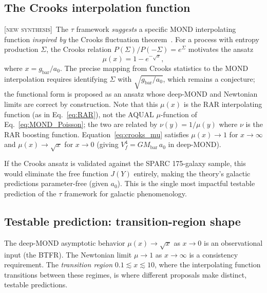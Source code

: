\documentclass[prd,twocolumn,superscriptaddress,longbibliography,floatfix]{revtex4-2}
\newcommand{\tauasym}{\tau}
\newcommand{\new}{\textsc{[new synthesis]}}
\begin{document}
\subsection{The Crooks interpolation function}
\label{sec:crooks}

\new\  The $\tauasym$ framework \emph{suggests} a specific MOND
interpolating function \emph{inspired by} the Crooks fluctuation
theorem~\cite{Crooks1999}.  For a process with entropy production
$\Sigma$, the Crooks relation $P(\Sigma)/P(-\Sigma) = e^\Sigma$
motivates the ansatz
\begin{equation}
\mu(x) = 1 - e^{-\sqrt{x}},
\label{eq:crooks_mu}
\end{equation}
where $x = g_{\mathrm{bar}}/a_0$.
The precise mapping from Crooks statistics to the MOND interpolation
requires identifying $\Sigma$ with $\sqrt{g_{\mathrm{bar}}/a_0}$,
which remains a conjecture; the functional form is proposed as an
ansatz whose deep-MOND and Newtonian limits are correct by
construction.
Note that this $\mu(x)$ is the RAR interpolating function
(as in Eq.~\eqref{eq:RAR}), not the AQUAL $\mu$-function of
Eq.~\eqref{eq:MOND_Poisson}; the two are related by
$\nu(y) = 1/\mu(y)$ where $\nu$ is the RAR boosting function.
Equation~\eqref{eq:crooks_mu} satisfies $\mu(x) \to 1$ for
$x \to \infty$ and $\mu(x) \to \sqrt{x}$ for $x \to 0$
(giving $V_f^4 = GM_{\mathrm{bar}}\,a_0$ in deep-MOND).

If the Crooks ansatz is validated against the SPARC 175-galaxy
sample, this would eliminate the free function $J(Y)$ entirely,
making the theory's galactic predictions parameter-free (given
$a_0$).  This is the single most impactful testable prediction of
the $\tauasym$ framework for galactic phenomenology.

\subsection{Testable prediction: transition-region shape}
\label{sec:sparc_test}

The deep-MOND asymptotic behavior $\mu(x) \to \sqrt{x}$ as
$x \to 0$ is an observational input (the BTFR).  The Newtonian
limit $\mu \to 1$ as $x \to \infty$ is a consistency requirement.
The \emph{transition region} $0.1 \lesssim x \lesssim 10$, where
the interpolating function transitions between these regimes, is
where different proposals make distinct, testable predictions.
\end{document}

